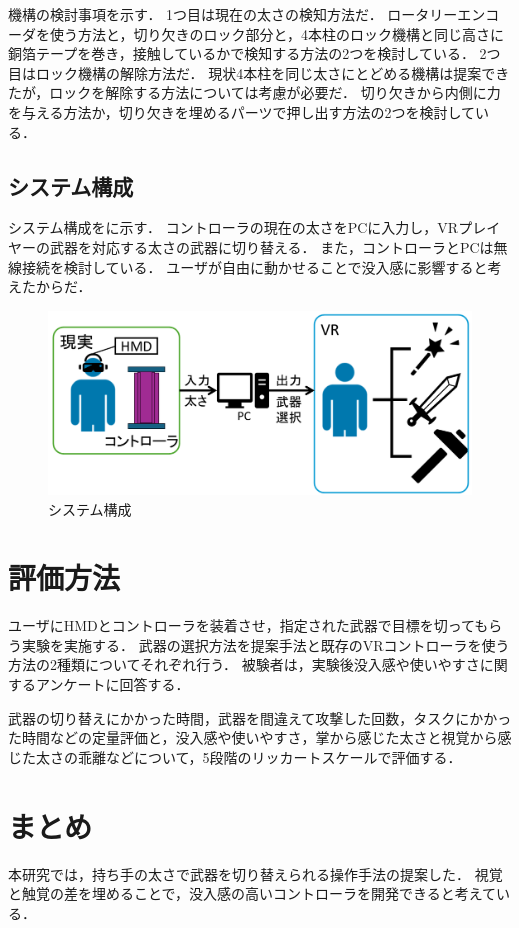\documentclass[uplatex]{jsarticle}
\begin{document}
機構の検討事項を示す．
1つ目は現在の太さの検知方法だ．
ロータリーエンコーダを使う方法と，切り欠きのロック部分と，4本柱のロック機構と同じ高さに銅箔テープを巻き，接触しているかで検知する方法の2つを検討している．
2つ目はロック機構の解除方法だ．
現状4本柱を同じ太さにとどめる機構は提案できたが，ロックを解除する方法については考慮が必要だ．
切り欠きから内側に力を与える方法か，切り欠きを埋めるパーツで押し出す方法の2つを検討している．

\subsection{システム構成}

システム構成をに示す．
コントローラの現在の太さをPCに入力し，VRプレイヤーの武器を対応する太さの武器に切り替える．
また，コントローラとPCは無線接続を検討している．
ユーザが自由に動かせることで没入感に影響すると考えたからだ．

\begin{figure}
    \centering
    \includegraphics[width=0.9\linewidth]{fig/構成図.png}
    \caption{システム構成}
    \label{fig:system}
\end{figure}


\section{評価方法}

ユーザにHMDとコントローラを装着させ，指定された武器で目標を切ってもらう実験を実施する．
武器の選択方法を提案手法と既存のVRコントローラを使う方法の2種類についてそれぞれ行う．
被験者は，実験後没入感や使いやすさに関するアンケートに回答する．

武器の切り替えにかかった時間，武器を間違えて攻撃した回数，タスクにかかった時間などの定量評価と，没入感や使いやすさ，掌から感じた太さと視覚から感じた太さの乖離などについて，5段階のリッカートスケールで評価する．

\section{まとめ}

本研究では，持ち手の太さで武器を切り替えられる操作手法の提案した．
視覚と触覚の差を埋めることで，没入感の高いコントローラを開発できると考えている．





\end{document}

